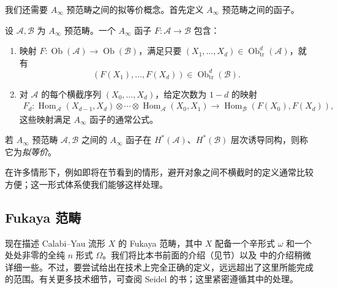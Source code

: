 我们还需要 $A_\infty$ 预范畴之间的拟等价概念。首先定义 $A_\infty$ 预范畴之间的函子。

\begin{definition}\label{def:8.12}
设 $\mathcal A,\mathcal B$ 为 $A_\infty$ 预范畴。一个 $A_\infty$ 函子 $F\colon\mathcal A\to\mathcal B$ 包含：
\begin{enumerate}
\item 映射 $F\colon\operatorname{Ob}(\mathcal A)\to\operatorname{Ob}(\mathcal B)$，满足只要 $(X_1,\ldots,X_d)\in\operatorname{Ob}_{\mathrm{tr}}^d(\mathcal A)$，就有
\[
(F(X_1),\ldots,F(X_d))\in\operatorname{Ob}_{\mathrm{tr}}^d(\mathcal B).
\]
\item 对 $\mathcal A$ 的每个横截序列 $(X_0,\ldots,X_d)$，给定次数为 $1-d$ 的映射
\[
\begin{aligned}
F_d\colon\operatorname{Hom}_{\mathcal A}(X_{d-1},X_d)\otimes\cdots
\otimes\operatorname{Hom}_{\mathcal A}(X_0,X_1)
\longrightarrow\operatorname{Hom}_{\mathcal B}(F(X_0),F(X_d)),
\end{aligned}
\]
这些映射满足 $A_\infty$ 函子的通常公式。
\end{enumerate}
\end{definition}

\begin{definition}\label{def:8.13}
若 $A_\infty$ 预范畴 $\mathcal A,\mathcal B$ 之间的 $A_\infty$ 函子在 $H^*(\mathcal A)$、$H^*(\mathcal B)$ 层次诱导同构，则称它为\emph{拟等价}。
\end{definition}

在许多情形下，例如即将在节看到的情形，避开对象之间不横截时的定义通常比较方便；这一形式体系使我们能够这样处理。

\subsection{Fukaya 范畴}\label{sec:8.3.3}

现在描述 Calabi--Yau 流形 $X$ 的 Fukaya 范畴，其中 $X$ 配备一个辛形式 $\omega$ 和一个处处非零的全纯 $n$ 形式 $\Omega$。我们将比本书前面的介绍（见节）以及  中的介绍稍微详细一些。不过，要尝试给出在技术上完全正确的定义，远远超出了这里所能完成的范围。有关更多技术细节，可查阅 Seidel 的书；这里紧密遵循其中的处理。

